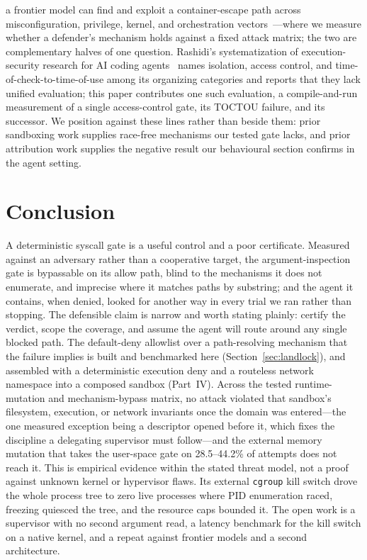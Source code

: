\documentclass[11pt]{article}
\begin{document}
a frontier model can find and exploit a container-escape path across misconfiguration, privilege,
kernel, and orchestration vectors~\cite{sandboxescape}---where we measure whether a defender's mechanism
holds against a fixed attack matrix; the two are complementary halves of one question. Rashidi's
systematization of execution-security research for AI coding agents~\cite{sok26} names isolation, access
control, and time-of-check-to-time-of-use among its organizing categories and reports that they lack
unified evaluation; this paper contributes one such evaluation, a compile-and-run measurement of a
single access-control gate, its TOCTOU failure, and its successor. We position against these lines rather
than beside them: prior sandboxing work supplies race-free mechanisms our tested gate lacks, and prior
attribution work supplies the negative result our behavioural section confirms in the agent setting.

\section{Conclusion}\label{sec:conclusion}

A deterministic syscall gate is a useful control and a poor certificate. Measured against an adversary
rather than a cooperative target, the argument-inspection gate is bypassable on its allow path, blind to
the mechanisms it does not enumerate, and imprecise where it matches paths by substring; and the agent it
contains, when denied, looked for another way in every trial we ran rather than stopping. The defensible claim is narrow and worth
stating plainly: certify the verdict, scope the coverage, and assume the agent will route around any single
blocked path. The default-deny allowlist over a path-resolving mechanism that the failure implies is built
and benchmarked here (Section~\ref{sec:landlock}), and assembled with a deterministic execution deny and a
routeless network namespace into a composed sandbox (Part~IV). Across the tested runtime-mutation and
mechanism-bypass matrix, no attack violated that sandbox's filesystem, execution, or network invariants
once the domain was entered---the one measured exception being a descriptor opened before it,
which fixes the discipline a delegating supervisor must follow---and the external memory mutation that
takes the user-space gate on 28.5--44.2\% of attempts does not reach it. This is empirical evidence within the
stated threat model, not a proof against unknown kernel or hypervisor flaws. Its external \texttt{cgroup}
kill switch drove the whole process tree to zero live processes where PID enumeration raced, freezing
quiesced the tree, and the resource caps bounded it. The open work is a supervisor with no second argument
read, a latency benchmark for the kill switch on a native kernel, and a repeat against frontier models and
a second architecture.
\end{document}
